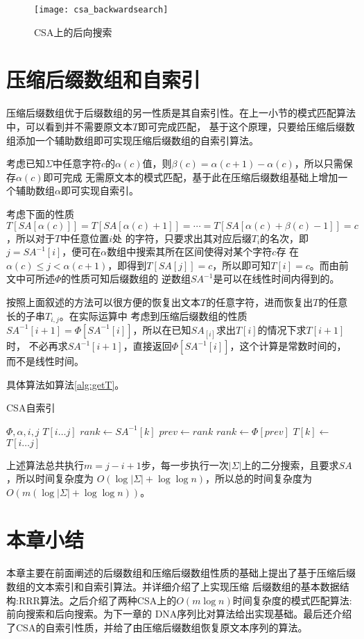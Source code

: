\begin{figure}[t]
    \centering
    \texttt{[image: csa\_backwardsearch]}
    \caption{CSA上的后向搜索}
    \label{figbackwardsearch}
\end{figure}

\section{压缩后缀数组和自索引}
压缩后缀数组优于后缀数组的另一性质是其自索引性。在上一小节的模式匹配算法中，可以看到并不需要原文本$T$即可完成匹配，
基于这个原理，只要给压缩后缀数组添加一个辅助数组即可实现压缩后缀数组的自索引算法。

考虑已知$\Sigma$中任意字符$c$的$\alpha(c)$值，则$\beta(c)=\alpha(c+1)-\alpha(c)$，所以只需保存$\alpha(c)$即可完成
无需原文本的模式匹配，基于此在压缩后缀数组基础上增加一个辅助数组$\alpha$即可实现自索引。

考虑下面的性质$T[SA[\alpha(c)]]=T[SA[\alpha(c)+1]]=\cdots=T[SA[\alpha(c)+\beta(c)-1]]=c$，所以对于$T$中任意位置$i$处
的字符，只要求出其对应后缀$T_i$的名次，即$j=SA^{-1}[i]$，便可在$\alpha$数组中搜索其所在区间使得对某个字符$c$存
在$\alpha(c)\leq j< \alpha(c+1)$，即得到$T[SA[j]]=c$，所以即可知$T[i]=c$。而由前文中可所述$\Phi$的性质可知后缀数组的
逆数组$SA^{-1}$是可以在线性时间内得到的。

按照上面叙述的方法可以很方便的恢复出文本$T$的任意字符，进而恢复出$T$的任意长的子串$T_{i,j}$。在实际运算中
考虑到压缩后缀数组的性质$SA^{-1}[i+1]=\Phi[SA^{-1}[i]]$，所以在已知$SA_[i]$求出$T[i]$的情况下求$T[i+1]$时，
不必再求$SA^{-1}[i+1]$，直接返回$\Phi[SA^{-1}[i]]$，这个计算是常数时间的，而不是线性时间\cite{sadakane2000compressed}。

具体算法如算法\ref{alg:getT}。

\begin{algorithm}
    \caption{CSA自索引}
    \label{alg:getT}
    \begin{algorithmic}[1]
        \Require $\Phi,\alpha,i,j$
        \Ensure $T[i\ldots j]$
                \State $rank \gets SA^{-1}[k]$
                \State $prev \gets rank$
            \Else
                \State $rank \gets \Phi[prev]$
            \EndIf
            \State $T[k] \gets$ 
        \EndFor
        \State \Return $T[i\ldots j]$
    \end{algorithmic}
\end{algorithm}

上述算法总共执行$m=j-i+1$步，每一步执行一次$|\Sigma|$上的二分搜索，且要求$SA$，所以时间复杂度为
$O(\log |\Sigma|+\log \log n)$，所以总的时间复杂度为$O(m(\log |\Sigma|+\log \log n))$。

\section{本章小结}
本章主要在前面阐述的后缀数组和压缩后缀数组性质的基础上提出了基于压缩后缀数组的文本索引和自索引算法。并详细介绍了上实现压缩
后缀数组的基本数据结构:RRR算法。之后介绍了两种CSA上的$O(m\log n)$时间复杂度的模式匹配算法:前向搜索和后向搜索。为下一章的
DNA序列比对算法给出实现基础。最后还介绍了CSA的自索引性质，并给了由压缩后缀数组恢复原文本序列的算法。
